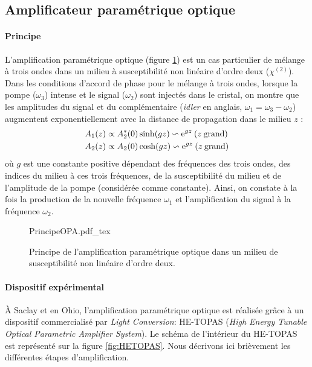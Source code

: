 \subsection{Amplificateur paramétrique optique}
\paragraph{Principe} L'amplification paramétrique optique (figure \ref{fig:PrincipeOPA}) est un cas particulier de mélange à trois ondes dans un milieu à susceptibilité non linéaire d'ordre deux ($\chi^{(2)}$). Dans les conditions d'accord de phase pour le mélange à trois ondes, lorsque la pompe ($\omega_3$) intense et le signal ($\omega_2$) sont injectés dans le cristal, on montre que les amplitudes du signal et du complémentaire (\textit{idler} en anglais, $\omega_1 = \omega_3 - \omega_2$) augmentent exponentiellement avec la distance de propagation dans le milieu $z$ :
\begin{align}
A_1(z) & \propto A_2^*(0) \sinh(gz) \backsim \mathrm{e}^{gz} \: (z \: \text{grand})\\
A_2(z) & \propto A_2(0) \cosh(gz) \backsim \mathrm{e}^{gz} \: (z \: \text{grand}) 
\end{align}
où $g$ est une constante positive dépendant des fréquences des trois ondes, des indices du milieu à ces trois fréquences, de la susceptibilité du milieu  et de l'amplitude de la pompe (considérée comme constante). Ainsi, on constate à la fois la production de la nouvelle fréquence $\omega_1$ et l'amplification du signal à la fréquence $\omega_2$.

\begin{figure}
\centering
\def\svgwidth{0.6\columnwidth}
{PrincipeOPA.pdf_tex}
\caption{Principe de l'amplification paramétrique optique dans un milieu de susceptibilité non linéaire d'ordre deux.}
\label{fig:PrincipeOPA}
\end{figure}

\paragraph{Dispositif expérimental} \`{A} Saclay et en Ohio, l'amplification paramétrique optique est réalisée grâce à un dispositif commercialisé par \textit{Light Conversion}: HE-TOPAS (\textit{High Energy Tunable Optical Parametric Amplifier System}). Le schéma de l'intérieur du HE-TOPAS est représenté sur la figure \ref{fig:HETOPAS}. Nous décrivons ici brièvement les différentes étapes d'amplification.

